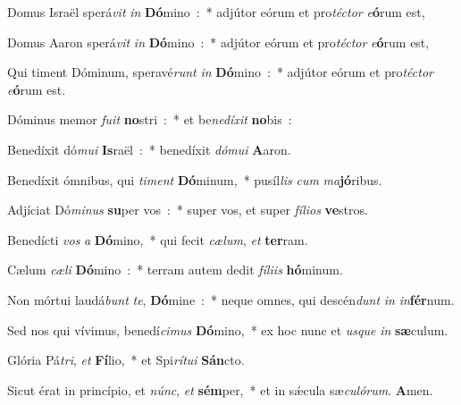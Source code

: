 \item Domus Israël sperá\emph{vit} \emph{in} \textbf{Dó}\-mino~:~* adjútor eórum et pro\emph{té}\-\emph{ctor} \emph{e}\-\textbf{ó}\-rum est,
\item Domus Aaron sperá\emph{vit} \emph{in} \textbf{Dó}\-mino~:~* adjútor eórum et pro\emph{té}\-\emph{ctor} \emph{e}\-\textbf{ó}\-rum est,
\item Qui timent Dóminum, speravé\emph{runt} \emph{in} \textbf{Dó}\-mino~:~* adjútor eórum et pro\emph{té}\-\emph{ctor} \emph{e}\-\textbf{ó}\-rum est.
\item Dóminus memor \emph{fu}\-\emph{it} \textbf{no}\-stri~:~* et be\emph{ne}\-\emph{dí}\-\emph{xit} \textbf{no}bis~:
\item Benedíxit dó\emph{mu}\-\emph{i} \textbf{Is}\-raël~:~* benedíxit \emph{dó}\-\emph{mu}\-\emph{i} \textbf{A}aron.
\item Benedíxit ómnibus, qui \emph{ti}\-\emph{ment} \textbf{Dó}\-minum,~* pu\-síl\-\emph{lis} \emph{cum} \emph{ma}\textbf{jó}ribus.
\item Adjíciat Dó\emph{mi}\-\emph{nus} \textbf{su}\-per vos~:~* super vos, et super \emph{fí}\-\emph{li}\-\emph{os} \textbf{ve}stros.
\item Benedícti \emph{vos} \emph{a} \textbf{Dó}\-mino,~* qui fecit \emph{cæ}\-\emph{lum}, \emph{et} \textbf{ter}ram.
\item Cælum \emph{cæ}\-\emph{li} \textbf{Dó}\-mino~:~* terram autem dedit \emph{fí}\-\emph{li}\-\emph{is} \textbf{hó}minum.
\item Non mórtui laudá\emph{bunt} \emph{te}, \textbf{Dó}\-mine~:~* neque omnes, qui descén\emph{dunt} \emph{in} \emph{in}\textbf{fér}num.
\item Sed nos qui vívimus, benedí\emph{ci}\-\emph{mus} \textbf{Dó}\-mino,~* ex hoc nunc et \emph{us}\-\emph{que} \emph{in} \textbf{sæ}culum.
\item Glória Pá\emph{tri}, \emph{et} \textbf{Fí}\-lio,~* et Spi\emph{rí}\-\emph{tu}\-\emph{i} \textbf{Sán}cto.
\item Sicut érat in princípio, et \emph{núnc}, \emph{et} \textbf{sém}\-per,~* et in sǽcula sæ\emph{cu}\-\emph{ló}\-\emph{rum}. \textbf{A}men.

